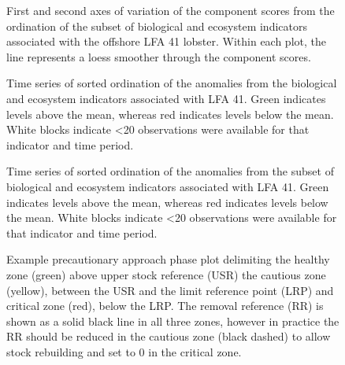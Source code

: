 \documentclass[11pt]{article}
\newcommand{\D}{.}
\newcommand{\e}{/backup/bio_data/bio.lobster/figures/} %
\begin{document}
\begin{figure}

    
    \caption{First and second axes of variation of the component scores from the ordination of the subset of biological and ecosystem indicators associated with the offshore LFA 41 lobster. Within each plot, the line represents a loess smoother through the component scores.}

\end{figure}
\clearpage


\begin{figure}

    
    \caption{Time series of sorted ordination of the anomalies from the biological and ecosystem indicators associated with LFA 41. Green indicates levels above the mean, whereas red indicates levels below the mean. White blocks indicate \textless 20 observations were available for that indicator and time period.}

\end{figure}


\begin{figure}

    
    \caption{Time series of sorted ordination of the anomalies from the subset of biological and ecosystem indicators associated with LFA 41. Green indicates levels above the mean, whereas red indicates levels below the mean. White blocks indicate \textless 20 observations were available for that indicator and time period.}

\end{figure}





\begin{figure}
\centering
    \caption{Example precautionary approach phase plot delimiting the healthy zone (green) above upper stock reference (USR) the cautious zone (yellow), between the USR and the limit reference point (LRP) and critical zone (red), below the LRP. The removal reference (RR) is shown as a solid black line in all three zones, however in practice the RR should be reduced in the cautious zone (black dashed) to allow stock rebuilding and set to 0 in the critical zone.
}

\end{figure}
\end{document}
